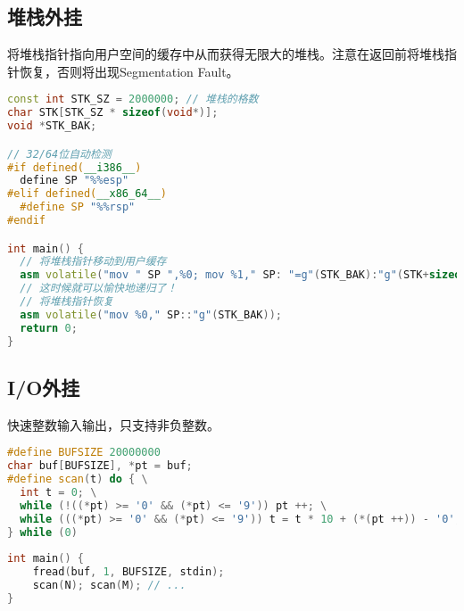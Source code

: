 \subsection{堆栈外挂}
\begin{mdframed}[hidealllines=true,backgroundcolor=blue!5]
将堆栈指针指向用户空间的缓存中从而获得无限大的堆栈。注意在返回前将堆栈指针恢复，否则将出现Segmentation Fault。
\end{mdframed}\vspace{-10pt}
\begin{lstlisting}[language=C++]
const int STK_SZ = 2000000; // 堆栈的格数
char STK[STK_SZ * sizeof(void*)];     
void *STK_BAK;

// 32/64位自动检测
#if defined(__i386__)
  define SP "%%esp"
#elif defined(__x86_64__)
  #define SP "%%rsp"
#endif

int main() {
  // 将堆栈指针移动到用户缓存
  asm volatile("mov " SP ",%0; mov %1," SP: "=g"(STK_BAK):"g"(STK+sizeof(STK)):);
  // 这时候就可以愉快地递归了！
  // 将堆栈指针恢复
  asm volatile("mov %0," SP::"g"(STK_BAK));
  return 0;
}

\end{lstlisting}
\subsection{I/O外挂}
\begin{mdframed}[hidealllines=true,backgroundcolor=blue!5]
快速整数输入输出，只支持非负整数。
\end{mdframed}\vspace{-10pt}
\begin{lstlisting}[language=C++]
#define BUFSIZE 20000000
char buf[BUFSIZE], *pt = buf;
#define scan(t) do { \
  int t = 0; \
  while (!((*pt) >= '0' && (*pt) <= '9')) pt ++; \
  while (((*pt) >= '0' && (*pt) <= '9')) t = t * 10 + (*(pt ++)) - '0'; \
} while (0)
 
int main() {
	fread(buf, 1, BUFSIZE, stdin);
	scan(N); scan(M); // ...
}


\end{lstlisting}
